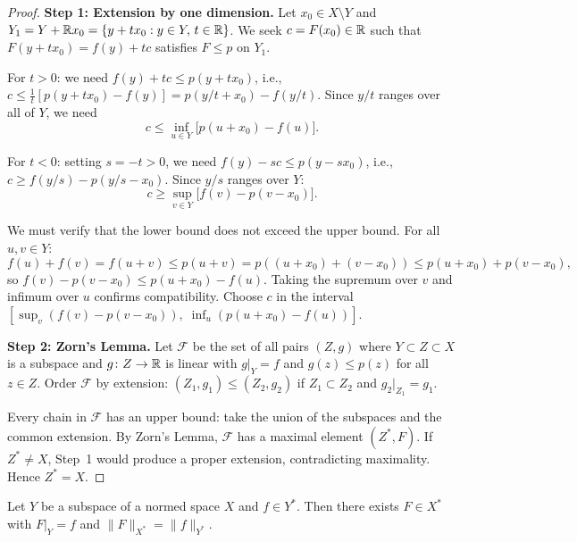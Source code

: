 \documentclass[11pt,a4paper]{article}
\begin{document}
\begin{proof}
\textbf{Step 1: Extension by one dimension.}
Let $x_0 \in X \setminus Y$ and
$Y_1 = Y + \mathbb{R} x_0 = \{y + t x_0 : y \in Y,\, t \in \mathbb{R}\}$. We seek
$c = F(x_0) \in \mathbb{R}$ such that $F(y + t x_0) = f(y) + tc$ satisfies
$F \leq p$ on $Y_1$.

For $t > 0$: we need $f(y) + tc \leq p(y + tx_0)$, i.e.,
$c \leq \frac{1}{t}[p(y + tx_0) - f(y)] = p(y/t + x_0) - f(y/t)$.
Since $y/t$ ranges over all of $Y$, we need
\begin{equation}
\label{eq:hb-upper}
    c \leq \inf_{u \in Y}\bigl[p(u + x_0) - f(u)\bigr].
\end{equation}

For $t < 0$: setting $s = -t > 0$, we need $f(y) - sc \leq p(y - sx_0)$,
i.e., $c \geq f(y/s) - p(y/s - x_0)$. Since $y/s$ ranges over $Y$:
\begin{equation}
\label{eq:hb-lower}
    c \geq \sup_{v \in Y}\bigl[f(v) - p(v - x_0)\bigr].
\end{equation}

We must verify that the lower bound does not exceed the upper bound.
For all $u, v \in Y$:
\[
    f(u) + f(v) = f(u + v) \leq p(u + v) = p((u + x_0) + (v - x_0))
    \leq p(u + x_0) + p(v - x_0),
\]
so $f(v) - p(v - x_0) \leq p(u + x_0) - f(u)$. Taking the supremum
over $v$ and infimum over $u$ confirms compatibility. Choose $c$ in the
interval
$[\sup_v(f(v) - p(v - x_0)),\; \inf_u(p(u + x_0) - f(u))]$.

\textbf{Step 2: Zorn's Lemma.}
Let $\mathcal{F}$ be the set of all pairs $(Z, g)$ where
$Y \subset Z \subset X$ is a subspace and $g \colon Z \to \mathbb{R}$ is linear
with $g|_Y = f$ and $g(z) \leq p(z)$ for all $z \in Z$. Order
$\mathcal{F}$ by extension: $(Z_1, g_1) \leq (Z_2, g_2)$ if
$Z_1 \subset Z_2$ and $g_2|_{Z_1} = g_1$.

Every chain in $\mathcal{F}$ has an upper bound: take the union of the
subspaces and the common extension. By Zorn's Lemma, $\mathcal{F}$ has
a maximal element $(Z^*, F)$. If $Z^* \neq X$, Step~1 would produce a
proper extension, contradicting maximality. Hence $Z^* = X$.
\end{proof}

\begin{corollary}
\label{cor:hahn-banach-normed}
Let $Y$ be a subspace of a normed space $X$ and $f \in Y^*$. Then there
exists $F \in X^*$ with $F|_Y = f$ and $\|F\|_{X^*} = \|f\|_{Y^*}$.
\end{corollary}
\end{document}
